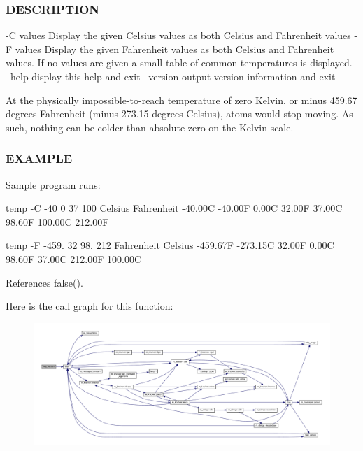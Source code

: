 \subsubsection*{D\+E\+S\+C\+R\+I\+P\+T\+I\+ON}

\begin{DoxyVerb}-C values  Display the given Celsius values as both Celsius and
           Fahrenheit values
-F values  Display the given Fahrenheit values as both Celsius and
           Fahrenheit values. If no values are given a small table of
           common temperatures is displayed.
--help     display this help and exit
--version  output version information and exit

At the physically impossible-to-reach temperature of zero Kelvin,
or minus 459.67 degrees Fahrenheit (minus 273.15 degrees Celsius),
atoms would stop moving. As such, nothing can be colder than absolute
zero on the Kelvin scale.
\end{DoxyVerb}


\subsubsection*{E\+X\+A\+M\+P\+LE}

Sample program runs\+:

temp -\/C -\/40 0 37 100 Celsius Fahrenheit -\/40.\+00C -\/40.\+00F 0.\+00C 32.\+00F 37.\+00C 98.\+60F 100.\+00C 212.\+00F

temp -\/F -\/459. 32 98. 212 Fahrenheit Celsius -\/459.\+67F -\/273.\+15C 32.\+00F 0.\+00C 98.\+60F 37.\+00C 212.\+00F 100.\+00C 

References false().

Here is the call graph for this function\+:
\nopagebreak
\begin{figure}[H]
\begin{center}
\leavevmode
\includegraphics[width=350pt]{temp_8f90_a39c21619b08a3c22f19e2306efd7f766_cgraph}
\end{center}
\end{figure}
\mbox{\label{temp_8f90_ae3dd9015488975da65db0e05e1d019c3}} 
